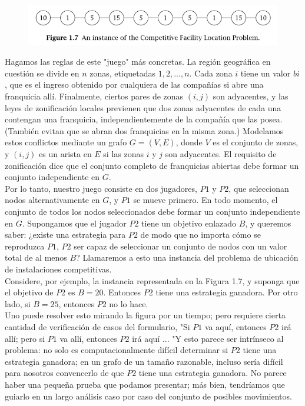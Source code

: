 \documentclass[a4paper]{article}
\begin{document}
\begin{figure}[h]
\centering
\includegraphics[scale=0.83]{Imagenes-Seccion1/fig1-7.PNG}
\end{figure}

Hagamos las reglas de este "juego" más concretas. La región geográfica en cuestión se divide en $n$ zonas, etiquetadas $1, 2,. . . ,n$. Cada zona $i$ tiene un valor $bi$, que es el ingreso obtenido por cualquiera de las compañías si abre una franquicia allí. Finalmente, ciertos pares de zonas $(i,j)$ son adyacentes, y las leyes de zonificación locales previenen que dos zonas adyacentes de cada una contengan una franquicia, independientemente de la compañía que las posea. (También evitan que se abran dos franquicias en la misma zona.) Modelamos estos conflictos mediante un grafo $G=(V,E)$, donde $V$ es el conjunto de zonas, y $(i,j)$ es un arista en $E$ si las zonas $i$ y $j$ son adyacentes. El requisito de zonificación dice que el conjunto completo de franquicias abiertas debe formar un conjunto independiente en $G$.\\

Por lo tanto, nuestro juego consiste en dos jugadores, $P1$ y $P2$, que seleccionan nodos alternativamente en $G$, y $P1$ se mueve primero. En todo momento, el conjunto de todos los nodos seleccionados debe formar un conjunto independiente en $G$. Supongamos que el jugador $P2$ tiene un objetivo enlazado $B$, y queremos saber: ¿existe una estrategia para $P2$ de modo que no importa cómo se reproduzca $P1$, $P2$ ser capaz de seleccionar un conjunto de nodos con un valor total de al menos $B$? Llamaremos a esto una instancia del problema de ubicación de instalaciones competitivas.\\

Considere, por ejemplo, la instancia representada en la Figura 1.7, y suponga que el objetivo de $P2$ es $B=20$. Entonces $P2$ tiene una estrategia ganadora. Por otro lado, si $B=25$, entonces $P2$ no lo hace.\\

Uno puede resolver esto mirando la figura por un tiempo; pero requiere cierta cantidad de verificación de casos del formulario, "Si $P1$ va aquí, entonces $P2$ irá allí; pero si $P1$ va allí, entonces $P2$ irá aquí ... "Y esto parece ser intrínseco al problema: no solo es computacionalmente difícil determinar si $P2$ tiene una estrategia ganadora; en un grafo de un tamaño razonable, incluso sería difícil para nosotros convencerlo de que $P2$ tiene una estrategia ganadora. No parece haber una pequeña prueba que podamos presentar; más bien, tendríamos que guiarlo en un largo análisis caso por caso del conjunto de posibles movimientos.\\
\end{document}
